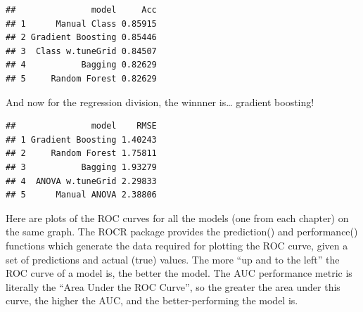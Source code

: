 \documentclass[]{book}
\newenvironment{Shaded}{\begin{snugshade}}{\end{snugshade}}
\newcommand{\DataTypeTok}[1]{\textcolor[rgb]{0.13,0.29,0.53}{#1}}
\newcommand{\DecValTok}[1]{\textcolor[rgb]{0.00,0.00,0.81}{#1}}
\newcommand{\KeywordTok}[1]{\textcolor[rgb]{0.13,0.29,0.53}{\textbf{#1}}}
\newcommand{\NormalTok}[1]{#1}
\newcommand{\OperatorTok}[1]{\textcolor[rgb]{0.81,0.36,0.00}{\textbf{#1}}}
\newcommand{\StringTok}[1]{\textcolor[rgb]{0.31,0.60,0.02}{#1}}
\begin{document}
\begin{verbatim}
##               model     Acc
## 1      Manual Class 0.85915
## 2 Gradient Boosting 0.85446
## 3  Class w.tuneGrid 0.84507
## 4           Bagging 0.82629
## 5     Random Forest 0.82629
\end{verbatim}

And now for the regression division, the winnner is\ldots{} gradient boosting!

\begin{Shaded}
\end{Shaded}

\begin{verbatim}
##               model    RMSE
## 1 Gradient Boosting 1.40243
## 2     Random Forest 1.75811
## 3           Bagging 1.93279
## 4  ANOVA w.tuneGrid 2.29833
## 5      Manual ANOVA 2.38806
\end{verbatim}

Here are plots of the ROC curves for all the models (one from each chapter) on the same graph. The ROCR package provides the prediction() and performance() functions which generate the data required for plotting the ROC curve, given a set of predictions and actual (true) values.
The more ``up and to the left'' the ROC curve of a model is, the better the model. The AUC performance metric is literally the ``Area Under the ROC Curve'', so the greater the area under this curve, the higher the AUC, and the better-performing the model is.
\end{document}
